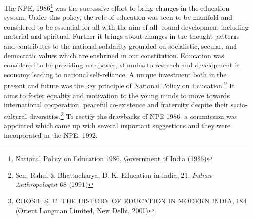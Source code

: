\begin{multicols}{2}
\noi
The NPE, 1986\footnote{National Policy on Education 1986, Government of India (1986)} was the successive effort to bring changes in the education system. Under this policy, the role of education was seen to be manifold and considered to be essential for all with the aim of all- round development including material and spiritual. Further it brings
about changes in the thought patterns and contributes to the national solidarity grounded on
socialistic, secular, and democratic values which are enshrined in our constitution. Education
was considered to be providing manpower, stimulus to research and development in economy
leading to national self-reliance. A unique investment both in the present and future was the
key principle of National Policy on Education.\footnote{Sen, Rahul \& Bhattacharya, D. K. Education in India, 21, \textit{Indian Anthropologist} 68 (1991)} It aims to foster equality and motivation to
the young minds to move towards international cooperation, peaceful co-existence and
fraternity despite their socio- cultural diversities.\footnote{GHOSH, S. C. THE HISTORY OF EDUCATION IN MODERN INDIA, 184 (Orient Longman Limited, New Delhi, 2000)} To rectify the drawbacks of NPE 1986, a
commission was appointed which came up with several important suggestions and they were
incorporated in the NPE, 1992.



\end{multicols}
